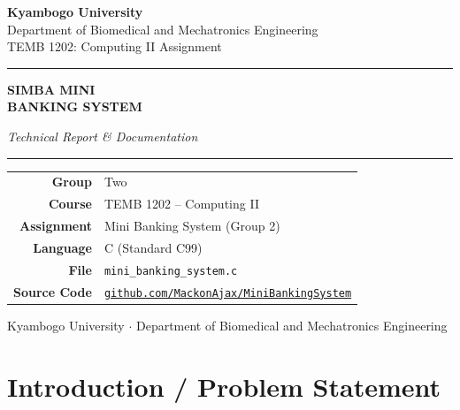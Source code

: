 \documentclass[12pt, a4paper]{article}
\begin{document}
\begin{titlepage}
    \centering
    \vspace*{1.5cm}

    {\Large\bfseries\color{black} Kyambogo University}\\[0.3cm]
    {\normalsize Department of Biomedical and Mechatronics Engineering}\\[0.1cm]
    {\normalsize TEMB 1202: Computing II Assignment}

    \vspace{1.2cm}
    \textcolor{black}{\rule{12cm}{2pt}}
    \vspace{0.5cm}

    {\Huge\bfseries\color{black} SIMBA MINI}\\[0.3cm]
    {\Huge\bfseries\color{black} BANKING SYSTEM}

    \vspace{0.4cm}
    {\large\itshape Technical Report \& Documentation}

    \textcolor{black}{\rule{12cm}{2pt}}

    \vspace{1.5cm}

    \begin{tabular}{rl}
        \textbf{Group}      & Two \\[4pt]
        \textbf{Course}     & TEMB 1202 – Computing II \\[4pt]
        \textbf{Assignment} & Mini Banking System (Group 2) \\[4pt]
        \textbf{Language}   & C (Standard C99) \\[4pt]
        \textbf{File}       & \texttt{mini\_banking\_system.c} \\[4pt]
        \textbf{Source Code}& \href{https://github.com/MackonAjax/MiniBankingSystem/blob/main/main.c}{\texttt{github.com/MackonAjax/MiniBankingSystem}} \\
    \end{tabular}

    \vfill
    {\small\color{black} Kyambogo University $\cdot$ Department of Biomedical and Mechatronics Engineering}
\end{titlepage}

\tableofcontents
\thispagestyle{fancy}
\newpage


\section{Introduction / Problem Statement}
\end{document}
